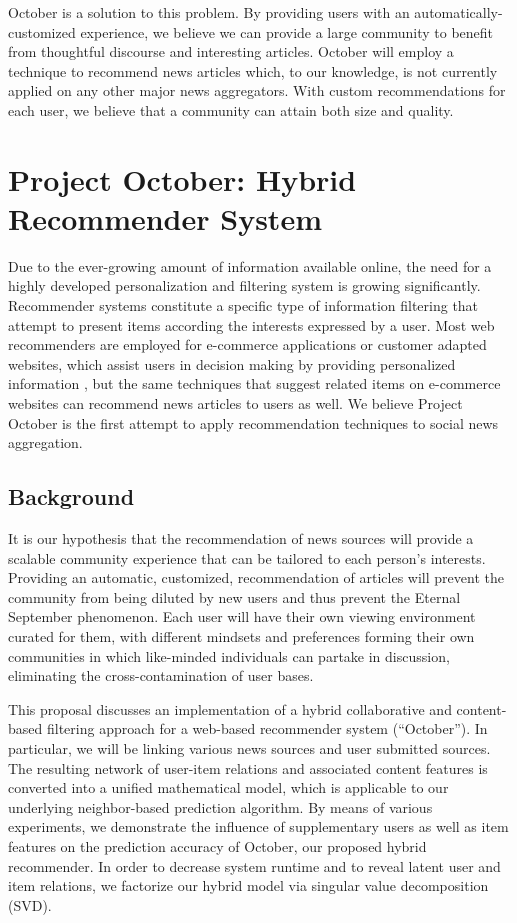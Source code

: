 \documentclass[11pt,letterpaper]{article}
\begin{document}
October is a solution to this problem.
By providing users with an automatically-customized experience, we believe we can provide a large community to benefit from thoughtful discourse and interesting articles.
October will employ a technique to recommend news articles which, to our knowledge, is not currently applied on any other major news aggregators.
With custom recommendations for each user, we believe that a community can attain both size and quality.

\newpage


\section{Project October: Hybrid Recommender System}

Due to the ever-growing amount of information available online, the need for a highly developed personalization and filtering system is growing significantly.
Recommender systems constitute a specific type of information filtering that
attempt to present items according the interests expressed by a user\cite{adom}.
Most web recommenders are employed for e-commerce applications or customer
adapted websites, which assist users in decision making by providing
personalized information \cite{linden}, but the same techniques that
suggest related items on e-commerce websites can recommend news articles to users as well.
We believe Project October is the first attempt to apply recommendation techniques to social news aggregation.

\subsection{Background}
It is our hypothesis that the recommendation of news sources will provide a scalable community experience that can be tailored to each person's interests.
Providing an automatic, customized, recommendation of articles will prevent the community from being diluted by new users and thus prevent the Eternal September phenomenon.
Each user will have their own viewing environment curated for them, with different mindsets and preferences forming their own communities in which like-minded individuals can partake in discussion, eliminating the cross-contamination of user bases.  

This proposal discusses an implementation of a hybrid collaborative and content-based filtering approach for a web-based recommender system (``October'').
In particular, we will be linking various news sources and user submitted sources.
The resulting network of user-item relations and associated content features is converted into a unified mathematical model, which is applicable to our underlying neighbor-based prediction algorithm.
By means of various experiments, we demonstrate the influence of supplementary users as well as item features on the prediction accuracy of October, our proposed hybrid recommender. In order to decrease system runtime and to reveal latent user and item relations, we factorize our hybrid model via singular value decomposition (SVD).
\end{document}
